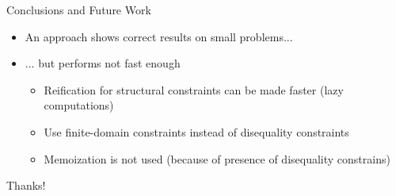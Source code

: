 \documentclass[aspectratio=169
  , xcolor={svgnames}
  , hyperref={ colorlinks,citecolor=Blue
             , linkcolor=DarkRed,urlcolor=DarkBlue}
  , russian
  ]{beamer}
\begin{document}
\begin{frame}{Conclusions and Future Work}
\begin{itemize}
\item An approach shows correct results on small problems...
\item ... but performs not fast enough
\begin{itemize}
\item Reification for structural constraints can be made faster (lazy computations)
\item Use finite-domain constraints instead of disequality constraints 
\item Memoization is not used (because of presence of disequality constrains)
\end{itemize}
\end{itemize}
\end{frame}

\begin{frame}

\begin{center}
{\Huge Thanks!}
\end{center}
\end{frame}
\end{document}
